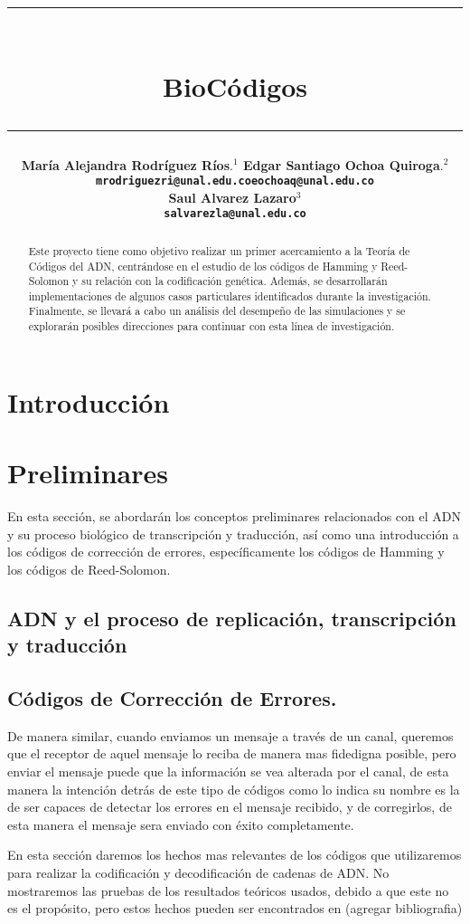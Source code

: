 \documentclass[12pt]{article}
\title{\vspace{-2cm}\par\noindent\rule{16cm}{1pt}\large
\\\bfseries BioCódigos
\vspace{-0.34cm}\par\noindent\hspace{0.15cm}\rule{16cm}{1pt}
\vspace{-0.6cm}
}
\author{\small \bfseries María Alejandra Rodríguez Ríos$.^1$
\quad \quad\small Edgar Santiago Ochoa Quiroga$.^{2}$
\\ \small \quad \texttt{mrodriguezri@unal.edu.co}\quad \quad \quad \quad \quad \quad \texttt{eochoaq@unal.edu.co}\quad\quad \quad\\ \small \bfseries Saul Alvarez Lazaro$^{3}$\\
\small \texttt{salvarezla@unal.edu.co}
}
\begin{document}
\maketitle
\begin{abstract}
Este proyecto tiene como objetivo realizar un primer acercamiento a la Teoría de Códigos del ADN, centrándose en el estudio de los códigos de Hamming y Reed-Solomon y su relación con la codificación genética. Además, se desarrollarán implementaciones de algunos casos particulares identificados durante la investigación. Finalmente, se llevará a cabo un análisis del desempeño de las simulaciones y se explorarán posibles direcciones para continuar con esta línea de investigación.
\end{abstract}

\section{Introducción}





\section{Preliminares}
En esta sección, se abordarán los conceptos preliminares relacionados con el ADN y su proceso biológico de transcripción y traducción, así como una introducción a los códigos de corrección de errores, específicamente los códigos de Hamming y los códigos de Reed-Solomon.
\subsection{ADN y el proceso de replicación, transcripción y traducción}

\subsection{Códigos de Corrección de Errores.}
De manera similar, cuando enviamos un mensaje a través de un canal, queremos que el receptor de aquel mensaje lo reciba de manera mas fidedigna posible, pero enviar el mensaje puede que la información se vea alterada por el canal, de esta manera la intención detrás de este tipo de códigos como lo indica su nombre es la de ser capaces de detectar los errores en el mensaje recibido, y de corregirlos, de esta manera el mensaje sera enviado con éxito completamente.

En esta sección daremos los hechos mas relevantes de los códigos que utilizaremos para realizar la codificación y decodificación de cadenas de ADN. No mostraremos las pruebas de los resultados teóricos usados, debido a que este no es el propósito, pero estos hechos pueden ser encontrados en (agregar bibliografia)


\end{document}

